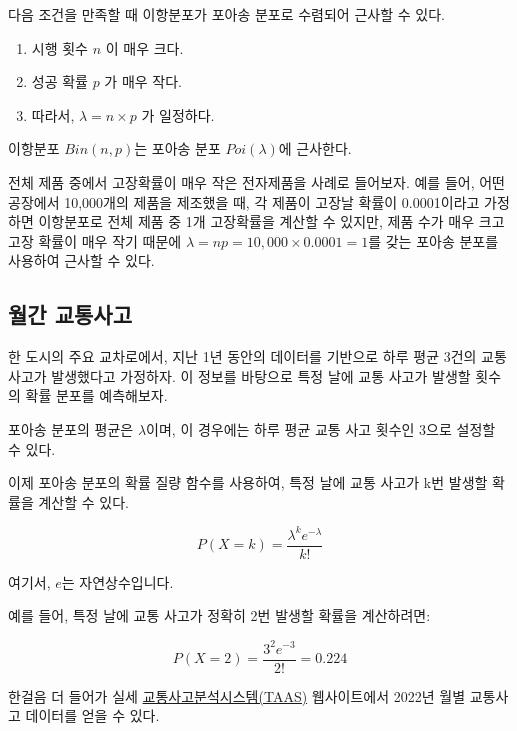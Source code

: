 \documentclass[
  letterpaper,
  chapter,a4paper,showtrims,openright,hidelinks]{oblivoir}
\providecommand{\tightlist}{%
  \setlength{\itemsep}{0pt}\setlength{\parskip}{0pt}}\usepackage{longtable,booktabs,array}
\begin{document}
다음 조건을 만족할 때 이항분포가 포아송 분포로 수렴되어 근사할 수 있다.

\begin{enumerate}
\def\labelenumi{\arabic{enumi}.}
\tightlist
\item
  시행 횟수 \(n\) 이 매우 크다.
\item
  성공 확률 \(p\) 가 매우 작다.
\item
  따라서, \(\lambda = n \times p\) 가 일정하다.
\end{enumerate}

이항분포 \(Bin(n, p)\)는 포아송 분포 \(Poi(\lambda)\)에 근사한다.

전체 제품 중에서 고장확률이 매우 작은 전자제품을 사례로 들어보자. 예를
들어, 어떤 공장에서 10,000개의 제품을 제조했을 때, 각 제품이 고장날
확률이 0.0001이라고 가정하면 이항분포로 전체 제품 중 1개 고장확률을
계산할 수 있지만, 제품 수가 매우 크고 고장 확률이 매우 작기 때문에
\(\lambda = np = 10,000 \times 0.0001 = 1\)를 갖는 포아송 분포를
사용하여 근사할 수 있다.

\hypertarget{uxc6d4uxac04-uxad50uxd1b5uxc0acuxace0}{%
\subsection{월간 교통사고}\label{uxc6d4uxac04-uxad50uxd1b5uxc0acuxace0}}

한 도시의 주요 교차로에서, 지난 1년 동안의 데이터를 기반으로 하루 평균
3건의 교통 사고가 발생했다고 가정하자. 이 정보를 바탕으로 특정 날에 교통
사고가 발생할 횟수의 확률 분포를 예측해보자.

포아송 분포의 평균은 \(\lambda\)이며, 이 경우에는 하루 평균 교통 사고
횟수인 3으로 설정할 수 있다.

이제 포아송 분포의 확률 질량 함수를 사용하여, 특정 날에 교통 사고가 k번
발생할 확률을 계산할 수 있다.

\[
P(X=k) = \frac{\lambda^k e^{-\lambda}}{k!}
\]

여기서, \(e\)는 자연상수입니다.

예를 들어, 특정 날에 교통 사고가 정확히 2번 발생할 확률을 계산하려면:

\[P(X=2) = \frac{3^2 e^{-3}}{2!} = 0.224\]

한걸음 더 들어가 실세
\href{https://taas.koroad.or.kr/}{교통사고분석시스템(TAAS)} 웹사이트에서
2022년 월별 교통사고 데이터를 얻을 수 있다.
\end{document}
